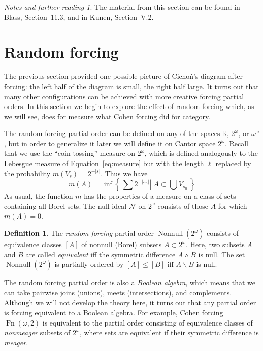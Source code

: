 \documentclass[11pt,oneside,a4paper]{amsbook}
\newcommand{\set}[1]{\left\{\,#1\,\right\}}
\newcommand{\R}{\mathbb R}
\newcommand{\Null}{\mathcal N}
\DeclareMathOperator{\Fn}{Fn}
\DeclareMathOperator{\Nonnull}{Nonnull}
\theoremstyle{definition}
\theoremstyle{plain}
\theoremstyle{definition}
\newtheorem{definition}[theorem]{Definition}
\theoremstyle{remark}
\newtheorem*{notes}{Notes and further reading}
\numberwithin{equation}{section}
\numberwithin{figure}{section}
\begin{document}
\begin{notes}
  The material from this section can be found in Blass, Section~11.3, and in Kunen, Section~V.2.
\end{notes}


\newpage
\section{Random forcing}

The previous section provided one possible picture of Cicho\'n's diagram after forcing: the left half of the diagram is small, the right half large. It turns out that many other configurations can be achieved with more creative forcing partial orders. In this section we begin to explore the effect of random forcing which, as we will see, does for measure what Cohen forcing did for category.

The random forcing partial order can be defined on any of the spaces $\R$, $2^\omega$, or $\omega^\omega$, but in order to generalize it later we will define it on Cantor space $2^\omega$. Recall that we use the ``coin-tossing'' measure on $2^\omega$, which is defined analogously to the Lebesgue measure of Equation~\eqref{eq:measure} but with the length $\ell$ replaced by the probability $m(V_s)=2^{-|s|}$. Thus we have
\[m(A)=\inf\set{\sum2^{-|s_n|}\left|\; A\subset\bigcup V_{s_n}\right.}
\]
As usual, the function $m$ has the properties of a measure on a class of sets containing all Borel sets. The null ideal $\Null$ on $2^\omega$ consists of those $A$ for which $m(A)=0$.

\begin{definition}
  The \emph{random forcing} partial order $\Nonnull(2^\omega)$ consists of equivalence classes $[A]$ of nonnull (Borel) subsets $A\subset2^\omega$. Here, two subsets $A$ and $B$ are called \emph{equivalent} iff the symmetric difference $A\mathbin{\vartriangle} B$ is null. The set $\Nonnull(2^\omega)$ is partially ordered by $[A]\leq[B]$ iff $A\smallsetminus B$ is null.
\end{definition}

The random forcing partial order is also a \emph{Boolean algebra}, which means that we can take pairwise joins (unions), meets (intersections), and complements. Although we will not develop the theory here, it turns out that any partial order is forcing equivalent to a Boolean algebra. For example, Cohen forcing $\Fn(\omega,2)$ is equivalent to the partial order consisting of equivalence classes of \emph{nonmeager} subsets of $2^\omega$, where sets are equivalent if their symmetric difference is \emph{meager}.
\end{document}
